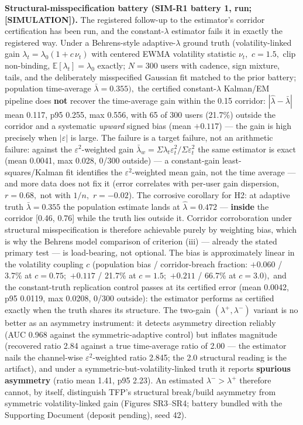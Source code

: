 \documentclass[
]{article}
\begin{document}
\textbf{Structural-misspecification battery (SIM-R1 battery 1, run;
{[}SIMULATION{]}).} The registered follow-up to the estimator's corridor
certification has been run, and the constant-\(\lambda\) estimator fails
it in exactly the registered way. Under a Behrens-style
adaptive-\(\lambda\) ground truth (volatility-linked gain
\(\lambda_t = \lambda_0(1 + c\,\nu_t)\) with centered EWMA volatility
statistic \(\nu_t,\) \(c = 1.5,\) clip non-binding,
\(\mathbb{E}[\lambda_t] = \lambda_0\) exactly; \(N = 300\) users with
cadence, sign mixture, tails, and the deliberately misspecified Gaussian
fit matched to the prior battery; population time-average
\(\bar{\lambda} = 0.355),\) the certified constant-\(\lambda\) Kalman/EM
pipeline does \textbf{not} recover the time-average gain within the 0.15
corridor: \(|\hat{\lambda} - \bar{\lambda}|\) mean 0.117, p95 0.255, max
0.556, with 65 of 300 users (21.7\%) outside the corridor and a
systematic \emph{upward} signed bias (mean \(+0.117\)) --- the gain is
high precisely when \(|\varepsilon|\) is large. The failure is a target
failure, not an arithmetic failure: against the
\(\varepsilon^{2}\)-weighted gain
\(\bar{\lambda}_w = \Sigma\lambda_t\varepsilon_t^{2}/\Sigma\varepsilon_t^{2}\)
the same estimator is exact (mean 0.0041, max 0.028, 0/300 outside) ---
a constant-gain least-squares/Kalman fit identifies the
\(\varepsilon^{2}\)-weighted mean gain, not the time average --- and
more data does not fix it (error correlates with per-user gain
dispersion, \(r = 0.68,\) not with \(1/n,\) \(r = -0.02\)). The
corrosive corollary for H2: at adaptive truth \(\bar{\lambda} = 0.355\)
the population estimate lands at \(\hat{\lambda} = 0.472\) ---
\textbf{inside} the corridor {[}0.46, 0.76{]} while the truth lies
outside it. Corridor corroboration under structural misspecification is
therefore achievable purely by weighting bias, which is why the Behrens
model comparison of criterion (iii) --- already the stated primary test
--- is load-bearing, not optional. The bias is approximately linear in
the volatility coupling \(c\) (population bias / corridor-breach
fraction: \(+0.060\) / 3.7\% at \(c = 0.75;\) \(+0.117\) / 21.7\% at
\(c = 1.5;\) \(+0.211\) / 66.7\% at \(c = 3.0),\) and the constant-truth
replication control passes at its certified error (mean 0.0042, p95
0.0119, max 0.0208, 0/300 outside): the estimator performs as certified
exactly when the truth shares its structure. The two-gain
\((\lambda^{+}, \lambda^{-})\) variant is no better as an asymmetry
instrument: it detects asymmetry direction reliably (AUC 0.968 against
the symmetric-adaptive control) but inflates magnitude (recovered ratio
2.84 against a true time-average ratio of 2.00 --- the estimator nails
the channel-wise \(\varepsilon^{2}\)-weighted ratio 2.845; the 2.0
structural reading is the artifact), and under a
symmetric-but-volatility-linked truth it reports \textbf{spurious
asymmetry} (ratio mean 1.41, p95 2.23). An estimated
\(\lambda^{-} > \lambda^{+}\) therefore cannot, by itself, distinguish
TFP's structural break/build asymmetry from symmetric volatility-linked
gain (Figures SR3--SR4; battery bundled with the Supporting Document
(deposit pending), seed 42).
\end{document}
